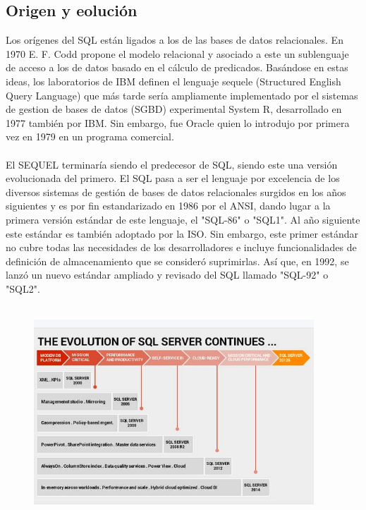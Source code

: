 \documentclass[preprint,12pt]{elsarticle}
\begin{document}
\subsection{Origen y eolución}
Los orígenes del SQL están ligados a los de las bases de datos relacionales. En 1970 E. F. Codd propone el modelo relacional y asociado a este un sublenguaje de acceso a los de datos basado en el cálculo de predicados. Basándose en estas ideas, los laboratorios de IBM definen el lenguaje sequele (Structured English Query Language) que más tarde sería ampliamente implementado por el sistemas de gestion de bases de datos (SGBD) experimental System R, desarrollado en 1977 también por IBM. Sin embargo, fue Oracle quien lo introdujo por primera vez en 1979 en un programa comercial.
\\
\\
El SEQUEL terminaría siendo el predecesor de SQL, siendo este una versión evolucionada del primero. El SQL pasa a ser el lenguaje por excelencia de los diversos sistemas de gestión de bases de datos relacionales surgidos en los años siguientes y es por fin estandarizado en 1986 por el ANSI, dando lugar a la primera versión estándar de este lenguaje, el "SQL-86" o "SQL1". Al año siguiente este estándar es también adoptado por la ISO.
Sin embargo, este primer estándar no cubre todas las necesidades de los desarrolladores e incluye funcionalidades de definición de almacenamiento que se consideró suprimirlas. Así que, en 1992, se lanzó un nuevo estándar ampliado y revisado del SQL llamado "SQL-92" o "SQL2".\cite{DWarehouse01}
\\
\\

\begin{figure}[htb]
				\begin{center}
					\includegraphics[width=10.5cm]{./IMAGENES/evolucion}
				\end{center}
			\end{figure}
\end{document}
